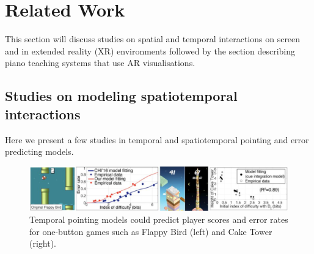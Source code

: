 \documentclass[manuscript,screen]{acmart}
\begin{document}
\section{Related Work}
This section will discuss studies on spatial and temporal interactions on screen and in extended reality (XR) environments followed by the section describing piano teaching systems that use AR visualisations. 

\subsection{Studies on modeling spatiotemporal interactions}
Here we present a few studies in temporal and spatiotemporal pointing and error predicting models. 

\begin{figure}[t]
\centering
 \includegraphics[width=12cm]{figures/flappybird.png}
    \caption{Temporal pointing models could predict player scores and error rates for one-button games such as Flappy Bird (left) and Cake Tower (right).
    }\label{fig:flappybird}
\end{figure}
\end{document}
